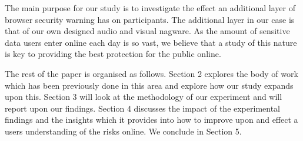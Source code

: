 \documentclass{mpaper}
\begin{document}
The main purpose for our study is to investigate the effect an additional layer of browser security warning has on participants. The additional layer in our case is that of our own designed audio and visual nagware. As the amount of sensitive data users enter online each day is so vast, we believe that a study of this nature is key to providing the best protection for the public online. 



The rest of the paper is organised as follows. Section 2 explores the body of work which has been previously done in this area and explore how our study expands upon this. Section 3 will look at the methodology of our experiment and will report upon our findings. Section 4 discusses the impact of the experimental findings and the insights which it provides into how to improve upon and effect a users understanding of the risks online. We conclude in Section 5.
\end{document}
